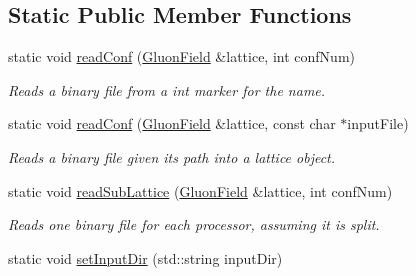 \subsection*{Static Public Member Functions}
\begin{DoxyCompactItemize}
\item 
static void \hyperlink{classLatticeIO_1_1InputConf_a70d70bfdc0252ddaa3d2bcd472590982}{read\+Conf} (\hyperlink{field_8h_afe80b127697eba6d6e7fbd8121c8d4ee}{Gluon\+Field} \&lattice, int conf\+Num)\hypertarget{classLatticeIO_1_1InputConf_a70d70bfdc0252ddaa3d2bcd472590982}{}\label{classLatticeIO_1_1InputConf_a70d70bfdc0252ddaa3d2bcd472590982}

\begin{DoxyCompactList}\small\item\em Reads a binary file from a int marker for the name. \end{DoxyCompactList}\item 
static void \hyperlink{classLatticeIO_1_1InputConf_aed71fc3df1e2a9999e4466b5eefdf723}{read\+Conf} (\hyperlink{field_8h_afe80b127697eba6d6e7fbd8121c8d4ee}{Gluon\+Field} \&lattice, const char $\ast$input\+File)\hypertarget{classLatticeIO_1_1InputConf_aed71fc3df1e2a9999e4466b5eefdf723}{}\label{classLatticeIO_1_1InputConf_aed71fc3df1e2a9999e4466b5eefdf723}

\begin{DoxyCompactList}\small\item\em Reads a binary file given its path into a lattice object. \end{DoxyCompactList}\item 
static void \hyperlink{classLatticeIO_1_1InputConf_a0ea75c17916f8ce880d02a13b127cea8}{read\+Sub\+Lattice} (\hyperlink{field_8h_afe80b127697eba6d6e7fbd8121c8d4ee}{Gluon\+Field} \&lattice, int conf\+Num)\hypertarget{classLatticeIO_1_1InputConf_a0ea75c17916f8ce880d02a13b127cea8}{}\label{classLatticeIO_1_1InputConf_a0ea75c17916f8ce880d02a13b127cea8}

\begin{DoxyCompactList}\small\item\em Reads one binary file for each processor, assuming it is split. \end{DoxyCompactList}\item 
static void \hyperlink{classLatticeIO_1_1InputConf_a49a84ce29fc32889d6c356c3afd09b71}{set\+Input\+Dir} (std\+::string input\+Dir)\hypertarget{classLatticeIO_1_1InputConf_a49a84ce29fc32889d6c356c3afd09b71}{}\label{classLatticeIO_1_1InputConf_a49a84ce29fc32889d6c356c3afd09b71}


\end{DoxyCompactItemize}
